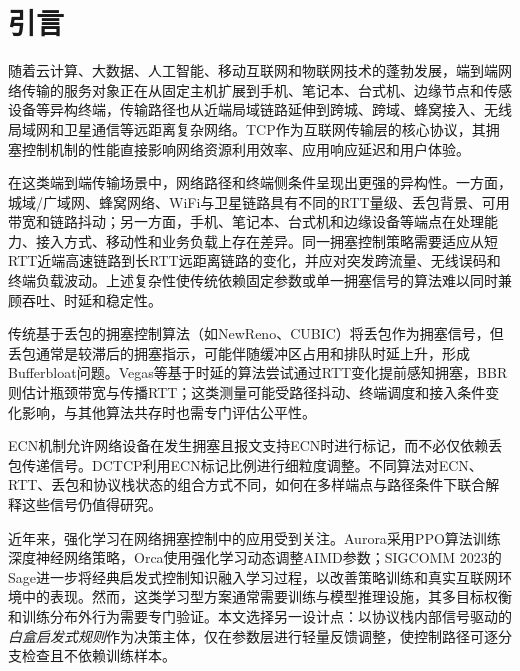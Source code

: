 \documentclass[10pt,twocolumn]{article}
\begin{document}
\begin{abstract}
\vspace{0.3em}
\noindent\textbf{关键词：}拥塞控制；启发式自适应；多信号融合；显式拥塞通知；自适应参数调优；远距离传输；异构终端
\end{abstract}


\section{引言}

随着云计算、大数据、人工智能、移动互联网和物联网技术的蓬勃发展，端到端网络传输的服务对象正在从固定主机扩展到手机、笔记本、台式机、边缘节点和传感设备等异构终端，传输路径也从近端局域链路延伸到跨城、跨域、蜂窝接入、无线局域网和卫星通信等远距离复杂网络。TCP作为互联网传输层的核心协议，其拥塞控制机制的性能直接影响网络资源利用效率、应用响应延迟和用户体验。

在这类端到端传输场景中，网络路径和终端侧条件呈现出更强的异构性。一方面，城域/广域网、蜂窝网络、WiFi与卫星链路具有不同的RTT量级、丢包背景、可用带宽和链路抖动；另一方面，手机、笔记本、台式机和边缘设备等端点在处理能力、接入方式、移动性和业务负载上存在差异。同一拥塞控制策略需要适应从短RTT近端高速链路到长RTT远距离链路的变化，并应对突发跨流量、无线误码和终端负载波动。上述复杂性使传统依赖固定参数或单一拥塞信号的算法难以同时兼顾吞吐、时延和稳定性。

传统基于丢包的拥塞控制算法（如NewReno\cite{newreno}、CUBIC\cite{cubic}）将丢包作为拥塞信号，但丢包通常是较滞后的拥塞指示，可能伴随缓冲区占用和排队时延上升，形成Bufferbloat问题\cite{bufferbloat}。Vegas\cite{vegas}等基于时延的算法尝试通过RTT变化提前感知拥塞，BBR\cite{bbr}则估计瓶颈带宽与传播RTT；这类测量可能受路径抖动、终端调度和接入条件变化影响，与其他算法共存时也需专门评估公平性\cite{bbrfairness}。

ECN机制\cite{rfc3168}允许网络设备在发生拥塞且报文支持ECN时进行标记，而不必仅依赖丢包传递信号。DCTCP\cite{dctcp}利用ECN标记比例进行细粒度调整。不同算法对ECN、RTT、丢包和协议栈状态的组合方式不同，如何在多样端点与路径条件下联合解释这些信号仍值得研究。

近年来，强化学习在网络拥塞控制中的应用受到关注\cite{rlcc}。Aurora\cite{aurora}采用PPO算法训练深度神经网络策略，Orca\cite{orca}使用强化学习动态调整AIMD参数；SIGCOMM 2023的Sage\cite{sage2023}进一步将经典启发式控制知识融入学习过程，以改善策略训练和真实互联网环境中的表现。然而，这类学习型方案通常需要训练与模型推理设施，其多目标权衡和训练分布外行为需要专门验证。本文选择另一设计点：以协议栈内部信号驱动的\emph{白盒启发式规则}作为决策主体，仅在参数层进行轻量反馈调整，使控制路径可逐分支检查且不依赖训练样本。
\end{document}
